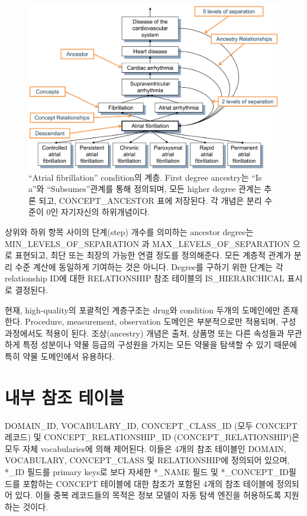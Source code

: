 \documentclass[11pt]{book}
\theoremstyle{definition}
\theoremstyle{definition}
\theoremstyle{definition}
\theoremstyle{remark}
\begin{document}
\begin{figure}

{\centering \includegraphics[width=1\linewidth]{images/StandardizedVocabularies/conceptAncestor} 

}

\caption{``Atrial fibrillation'' condition의 계층. First degree
ancestry는 ``Is a''와 ``Subsumes''관계를 통해 정의되며, 모든 higher
degree 관계는 추론 되고, CONCEPT\_ANCESTOR 표에 저장된다. 각 개념은 분리
수준이 0인 자기자신의 하위개념이다. }\label{fig:conceptAncestor}
\end{figure}

상위와 하위 항목 사이의 단계(step) 개수를 의미하는 ancestor degree는
MIN\_LEVELS\_OF\_SEPARATION 과 MAX\_LEVELS\_OF\_SEPARATION 으로
표현되고, 최단 또는 최장의 가능한 연결 정도를 정의해준다. 모든 계층적
관계가 분리 수준 계산에 동일하게 기여하는 것은 아니다. Degree를 구하기
위한 단계는 각 relationship ID에 대한 RELATIONSHIP 참조 테이블의
IS\_HIERARCHICAL 표시로 결정된다.

현재, high-quality의 포괄적인 계층구조는 drug와 condition 두개의
도메인에만 존재한다. Procedure, measurement, observation 도메인은
부분적으로만 적용되며, 구성과정에서도 적용이 된다. 조상(ancestry) 개념은
출처, 상품명 또는 다른 속성들과 무관하게 특정 성분이나 약물 등급의
구성원을 가지는 모든 약물을 탐색할 수 있기 때문에 특히 약물 도메인에서
유용하다.

\section{내부 참조 테이블}\label{--}

DOMAIN\_ID, VOCABULARY\_ID, CONCEPT\_CLASS\_ID (모두 CONCEPT 레코드) 및
CONCEPT\_RELATIONSHIP\_ID (CONCEPT\_RELATIONSHIP)은 모두 자체
vocabularies에 의해 제어된다. 이들은 4개의 참조 테이블인 DOMAIN,
VOCABULARY, CONCEPT\_CLASS 및 RELATIONSHIP에 정의되어 있으며, *\_ID
필드를 primary keys로 보다 자세한 *\_NAME 필드 및 *\_CONCEPT\_ID필드를
포함하는 CONCEPT 테이블에 대한 참조가 포함된 4개의 참조 테이블에
정의되어 있다. 이들 중복 레코드들의 목적은 정보 모델이 자동 탐색 엔진을
허용하도록 지원하는 것이다.
\end{document}
